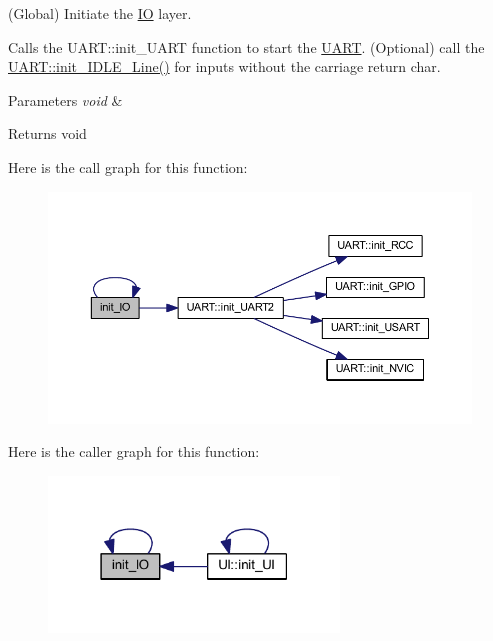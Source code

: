 (Global) Initiate the \mbox{\hyperlink{namespace_i_o}{IO}} layer. 

Calls the U\+A\+R\+T\+::init\+\_\+\+U\+A\+RT function to start the \mbox{\hyperlink{namespace_u_a_r_t}{U\+A\+RT}}. (Optional) call the \mbox{\hyperlink{namespace_u_a_r_t_aae0befbeb6fc7e852f7a200e9a9f4c7c}{U\+A\+R\+T\+::init\+\_\+\+I\+D\+L\+E\+\_\+\+Line()}} for inputs without the carriage return char.


\begin{DoxyParams}{Parameters}
{\em void} & \\
\hline
\end{DoxyParams}
\begin{DoxyReturn}{Returns}
void 
\end{DoxyReturn}
Here is the call graph for this function\+:\nopagebreak
\begin{figure}[H]
\begin{center}
\leavevmode
\includegraphics[width=350pt]{namespace_i_o_a83055f0dd9e551c9e898a69d48530663_cgraph}
\end{center}
\end{figure}
Here is the caller graph for this function\+:\nopagebreak
\begin{figure}[H]
\begin{center}
\leavevmode
\includegraphics[width=219pt]{namespace_i_o_a83055f0dd9e551c9e898a69d48530663_icgraph}
\end{center}
\end{figure}
\mbox{\label{namespace_i_o_a1087fba97ca797e5ca155228ff9eec55}} 

